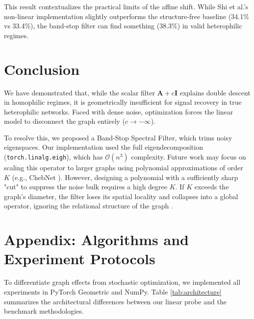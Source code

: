 \documentclass[10pt]{article}
\begin{document}
This result contextualizes the practical limits of the affine shift.
While Shi et al.'s non-linear implementation slightly outperforms the structure-free baseline (34.1\% vs 33.4\%), the band-stop filter can find something (38.3\%) in valid heterophilic regimes.


\section{Conclusion}
We have demonstrated that, while the scalar filter $\mathbf{A} + c\mathbf{I}$ explains double descent in homophilic regimes, it is geometrically insufficient for signal recovery in true heterophilic networks.
Faced with dense noise, optimization forces the linear model to disconnect the graph entirely ($c \to -\infty$).

To resolve this, we proposed a Band-Stop Spectral Filter, which trims noisy eigenspaces.
Our implementation used the full eigendecomposition (\texttt{torch.linalg.eigh}), which has $\mathcal{O}(n^3)$ complexity.
Future work may focus on scaling this operator to larger graphs using polynomial approximations of order $K$ (e.g., ChebNet \parencite{defferrard2016}).
However, designing a polynomial with a sufficiently sharp "cut" to suppress the noise bulk requires a high degree $K$.
If $K$ exceeds the graph's diameter, the filter loses its spatial locality and collapses into a global operator, ignoring the relational structure of the graph \parencite{levie2018}.

\printbibliography

\section*{Appendix: Algorithms and Experiment Protocols}

To differentiate graph effects from stochastic optimization, we implemented all experiments in PyTorch Geometric and NumPy. Table \ref{tab:architecture} summarizes the architectural differences between our linear probe and the benchmark methodologies.
\end{document}
